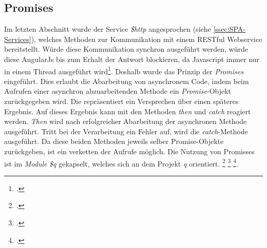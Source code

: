 \subsection{Promises}
\label{ssec:SPA-Promises}
Im letzten Abschnitt wurde der Service \textit{\$http} angesprochen (siehe \ref{ssec:SPA-Services}), welches Methoden zur Kommunikation mit einem RESTful Webservice bereitstellt. Würde diese Kommunikation synchron ausgeführt werden, würde diese AngularJs bis zum Erhalt der Antwort blockieren, da Javascript immer nur in einem Thread ausgeführt wird\footcite{online:javascript:single-threaded}. Deshalb wurde das Prinzip der \textit{Promises} eingeführt. Dies erlaubt die Abarbeitung von asynchronem Code, indem beim Aufrufen einer asynchron abzuarbeitenden Methode ein \textit{Promise}-Objekt zurückgegeben wird. Die repräsentiert ein Versprechen über einen späteres Ergebnis. Auf dieses Ergebnis kann mit den Methoden \textit{then} und \textit{catch} reagiert werden. \textit{Then} wird nach erfolgreicher Abarbeitung der asynchronen Methode ausgeführt. Tritt bei der Verarbeitung ein Fehler auf, wird die \textit{catch}-Methode ausgeführt. Da diese beiden Methoden jeweils selber Promise-Objekte zurückgeben, ist ein verketten der Aufrufe möglich. 
Die Nutzung von Promisses ist im \textit{Module} \textit{\$q} gekapselt, welches sich an dem Projekt \textit{q} orientiert. 
\footcite{online:angular:module:q} 
\footcite{online:doc_q} 
\footcite[S. 211ff]{book:AngularJs:Steyer2015}.
